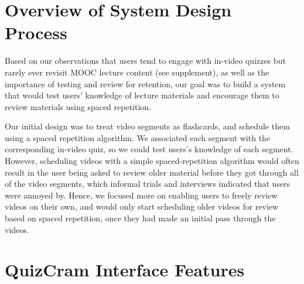 \documentclass{sigchi}
\begin{document}



\section{Overview of System Design Process}

Based on our observations that users tend to engage with in-video quizzes but rarely ever revisit MOOC lecture content (see supplement), as well as the importance of testing and review for retention, our goal was to build a system that would test users' knowledge of lecture materials and encourage them to review materials using spaced repetition.


Our initial design was to treat video segments as flashcards, and schedule them using a spaced repetition algorithm. We associated each segment with the corresponding in-video quiz, so we could test users's knowledge of each segment. However, scheduling videos with a simple spaced-repetition algorithm would often result in the user being asked to review older material before they got through all of the video segments, which informal trials and interviews indicated that users were annoyed by. Hence, we focused more on enabling users to freely review videos on their own, and would only start scheduling older videos for review based on spaced repetition, once they had made an initial pass through the videos.

\section{QuizCram Interface Features}
\end{document}

